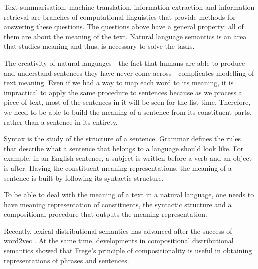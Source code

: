 Text summarisation, machine translation, information extraction and information
retrieval are branches of computational linguistics that provide methods for
answering these questions. The questions above have a general property: all of
them are about the meaning of the text. Natural language semantics is an area that studies meaning and thus, is necessary to solve the tasks.

The creativity of natural languages---the fact that humans are able to produce
and understand sentences they have never come across---complicates modelling of
text meaning. Even if we had a way to map each word to its meaning, it is
impractical to apply the same procedure to sentences because as we process a
piece of text, most of the sentences in it will be seen for the fist time.
Therefore, we need to be able to build the meaning of a sentence from its
constituent parts, rather than a sentence in its entirety.
%

Syntax is the study of the structure of a sentence. Grammar defines the rules
that describe what a sentence that belongs to a language should look like. For
example, in an English sentence, a subject is written before a verb and an
object is after. Having the constituent meaning representations, the meaning of
a sentence is built by following its syntactic structure.

To be able to deal with the meaning of a text in a natural language, one needs to have meaning representation of constituents, the syntactic structure and a compositional procedure that outputs the meaning representation.

Recently, lexical distributional semantics \cite{BullinariaLevy2012,Bullinaria2007,Turney:2010:FMV:1861751.1861756} has advanced after the success of word2vec \cite{mikolov2013linguistic,mikolov2013distributed,mikolov2013efficient}. At the same time, developments in compositional distributional semantics \cite{mitchell2010composition,maillard-clark-grefenstette:2014:TTNLS,Grefenstette:2011:ESC:2145432.2145580,Grefenstette:2011:ETV:2140490.2140497,kartsadrqpl2014,fried-polajnar-clark:2015:ACL-IJCNLP} showed that Frege's principle of compositionality \cite{Janssen2001} is useful in obtaining representations of phrases and sentences.
%
%
%

